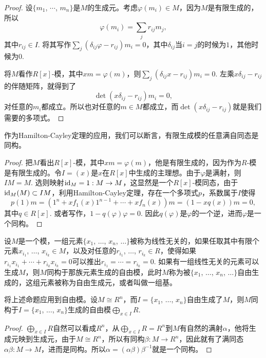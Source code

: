 \begin{proof}
	设$\{m_1$, $\cdots$, $m_n\}$是$M$的生成元。考虑$\varphi(m_i)\in M$，因为$M$是有限生成的，所以
	\[
	\varphi(m_i)=\sum_{j}r_{ij}m_j,
	\]
	其中$r_{ij}\in I$. 将其写作$\sum_{j}(\delta_{ij}\varphi-r_{ij})m_i=0$，其中$\delta_{ij}$当$i=j$的时候为$1$，其他时候为$0$.

	将$M$看作$R[x]$-模，其中$xm=\varphi(m)$，则$\sum_{j}(\delta_{ij}x-r_{ij})m_i=0$. 左乘$x\delta_{ij}-r_{ij}$的伴随矩阵，就得到了
	\[
	\det\left(x\delta_{ij}-r_{ij}\right)m_i=0,
	\]
	对任意的$m_i$都成立。所以也对任意的$m\in M$都成立，而$\det\left(x\delta_{ij}-r_{ij}\right)$就是我们需要的多项式。
\end{proof}

\para 作为Hamilton-Cayley定理的应用，我们可以断言，有限生成模的任意满自同态是同构。

\begin{proof}
	把$M$看出$R[x]$-模，其中$xm=\varphi(m)$，他是有限生成的，因为作为$R$-模是有限生成的。令$I=(x)$是$x$在$R[x]$中生成的主理想。由于$\varphi$是满射，则$IM=M$. 选则映射$\operatorname{id}_M=1:M\to M$，这显然是一个$R[x]$-模同态，由于$\operatorname{id}_M(M)\subset IM$，利用Hamilton-Cayley定理，存在一个多项式$p$，系数属于$I$使得
	\[
	p(1)m=\left(1^n+xf_1(x)1^{n-1}+\cdots+xf_n(x)\right)m=(1-xq(x))m=0,
	\]
	其中$q\in R[x]$. 或者写作，$1-q(\varphi)\varphi=0$. 因此$q(\varphi)$是$\varphi$的一个逆，进而$\varphi$是一个同构。
\end{proof}

\para 设$M$是一个模，一组元素$\{x_1$, $\dots$, $x_n$, $\dots\}$被称为线性无关的，如果任取其中有限个元素$x_{i_1}$, $\dots$, $x_{i_k}\in M$，以及对任意的$r_{i_1}$, $\dots$, $r_{i_k}\in R$，使得如果$r_{i_1}x_{i_1}+\cdots+r_{i_k}x_{i_k}=0$可以推出$r_{i_1}=\cdots=r_{i_k}=0$. 如果有一组线性无关的元素可以生成$M$，则$M$同构于那族元素生成的自由模，此时$M$称为被$\{x_1$, $\dots$, $x_n$, $\dots\}$自由生成的，这组元素被称为自由生成元，或者叫做一组基。

\para 将上述命题应用到自由模。设$M\cong R^n$，而$I=\{x_1$, $\dots$, $x_n\}$自由生成了$M$，则$M$同构于$I=\{x_1$, $\dots$, $x_n\}$生成的自由模$\bigoplus_{x\in I} R$.

\begin{proof}
	$\bigoplus_{x\in I} R$自然可以看成$R^n$，从$\bigoplus_{x\in I} R=R^n$到$M$有自然的满射$\alpha$，他将生成元映到生成元，由于$M\cong R^n$，所以有同构$\beta:M\to R^n$，因此就有了满同态$\alpha\beta:M\to M$，进而是同构。所以$\alpha =(\alpha\beta)\beta^{-1}$就是一个同构。
\end{proof}

